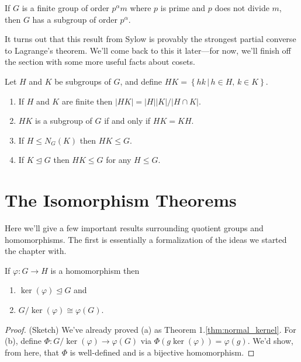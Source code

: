 \documentclass[../m171main.tex]{subfiles}
\begin{document}
\begin{theorem}
    If $G$ is a finite group of order $p^{\alpha} m$ where $p$ is prime and $p$ does not divide $m$,    %
    then $G$ has a subgroup of order $p^{\alpha}$.
\end{theorem}

It turns out that this result from Sylow is provably the strongest partial converse to Lagrange's theorem.
We'll come back to this it later---for now, we'll finish off the section with some more useful facts about cosets.

\begin{theorem}[]
    Let $H$ and $K$ be subgroups of $G$, and define $HK = \left\{ hk \,|\, h \in H, \, k \in K \right\}$.
    \begin{enumerate}[label=(\alph*)]
        \item If $H$ and $K$ are finite then $|HK| = |H| |K| / |H \cap K|$.
        \item $HK$ is a subgroup of $G$ if and only if $HK = KH$.
        \item If $H \leq N_G(K)$ then $HK \leq G$.
        \item If $K \trianglelefteq G$ then $HK \leq G$ for any $H \leq G$.
    \end{enumerate}
\end{theorem}

\section{The Isomorphism Theorems}
Here we'll give a few important results surrounding quotient groups and homomorphisms.
The first is essentially a formalization of the ideas we started the chapter with.

\begin{theorem}
    If $\varphi : G \to H$ is a homomorphism then
    \begin{enumerate}[label=(\alph*)]
        \item $\ker(\varphi) \trianglelefteq G$ and
        \item $G / \ker(\varphi) \cong \varphi(G)$.
    \end{enumerate}
\end{theorem}

\begin{proof}
    (Sketch)
    We've already proved (a) as Theorem 1.\ref{thm:normal_kernel}.
    For (b), define $\Phi : G / \ker (\varphi) \to \varphi(G)$ via $\Phi(g \ker (\varphi)) = \varphi(g)$.
    We'd show, from here, that $\Phi$ is well-defined and is a bijective homomorphism.
\end{proof}
\end{document}
